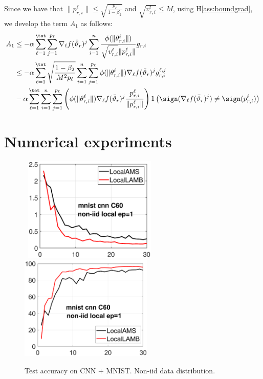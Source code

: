 \documentclass{article}
\begin{document}
Since we have that $\|p_{r,i}^{\ell}\| \leq \sqrt{\frac{p_\ell}{1-\beta_2}}$ and $\sqrt{v^{t}_{r,i}} \leq M$, using H\ref{ass:boundgrad}, we develop the term $A_1$ as follows:
\begin{align}
A_1 & \leq - \alpha \sum_{\ell=1}^\tot \sum_{j=1}^{p_\ell} \nabla_{\ell} f(\bar{\vartheta}_r)^j  \sum_{i = 1}^n \frac{\phi(\|\theta_{r,i}^{\ell}\|)}{\sqrt{v^{t}_{r,i}} \|p_{r,i}^{\ell}\|} g_{r,i}\\
& \leq - \alpha \sum_{\ell=1}^\tot  \sqrt{\frac{1-\beta_2}{M^2 p_\ell}} \sum_{i = 1}^n \sum_{j=1}^{p_\ell}   \phi(\|\theta_{r,i}^{\ell}\|)  \nabla_{\ell} f(\bar{\vartheta}_r)^j  g^{\ell, j}_{r,i}\\
& - \alpha \sum_{\ell=1}^\tot \sum_{i = 1}^n \sum_{j=1}^{p_\ell}   \left( \phi(\|\theta_{r,i}^{\ell}\|)  \nabla_{\ell} f(\bar{\vartheta}_r)^j  \frac{p_{r,i}^{\ell}}{ \|p_{r,i}^{\ell}\|}\right)\mathsf{1}\left( \sign(  \nabla_{\ell} f(\bar{\vartheta}_r)^j) \neq  \sign( p_{r,i}^{\ell}) \right)
\end{align}




\section{Numerical experiments}\label{sec:numerical}

\begin{figure}[h]
    \begin{center}
        \mbox{
        \includegraphics[width=2.5in]{figure/mnist_trainloss_cnn_ep1_client60_iid0.eps}
        \includegraphics[width=2.5in]{figure/mnist_testerror_cnn_ep1_client60_iid0.eps}
        }
    \end{center}
    \vspace{-0.1in}
	\caption{Test accuracy on CNN + MNIST. Non-iid data distribution.}
	\label{fig:mnist-cnn-noniid}
\end{figure}
\end{document}
